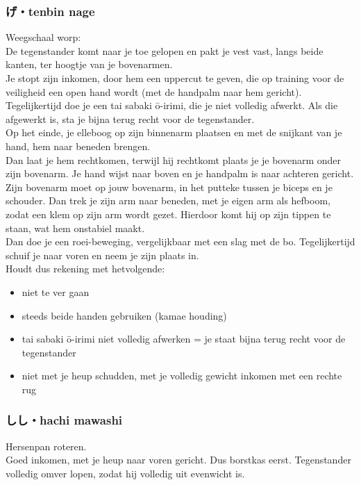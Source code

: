 \subsubsection{げ・tenbin nage}
Weegschaal worp:\\
De tegenstander komt naar je toe gelopen en pakt je vest vast, langs beide kanten, ter hoogtje van je bovenarmen.\\
Je stopt zijn inkomen, door hem een uppercut te geven, die op training voor de veiligheid een open hand wordt (met de handpalm naar hem gericht).\\
Tegelijkertijd doe je een tai sabaki \={o}-irimi, die je niet volledig afwerkt. Als die afgewerkt is, sta je bijna terug recht voor de tegenstander.\\
Op het einde, je elleboog op zijn binnenarm plaatsen en met de snijkant van je hand, hem naar beneden brengen.\\
Dan laat je hem rechtkomen, terwijl hij rechtkomt plaats je je bovenarm onder zijn bovenarm. Je hand wijst naar boven en je handpalm is naar achteren gericht. Zijn bovenarm moet op jouw bovenarm, in het putteke tussen je biceps en je schouder. Dan trek je zijn arm naar beneden, met je eigen arm als hefboom, zodat een klem op zijn arm wordt gezet. Hierdoor komt hij op zijn tippen te staan, wat hem onstabiel maakt.\\
Dan doe je een roei-beweging, vergelijkbaar met een slag met de bo. Tegelijkertijd schuif je naar voren en neem je zijn plaats in.\\

Houdt dus rekening met hetvolgende:
\begin{itemize}
    \item niet te ver gaan
    \item steeds beide handen gebruiken (kamae houding)
    \item tai sabaki \={o}-irimi niet volledig afwerken = je staat bijna terug recht voor de tegenstander
    \item niet met je heup schudden, met je volledig gewicht inkomen met een rechte rug
\end{itemize}

\subsubsection{しし・hachi mawashi}
Hersenpan roteren.\\
Goed inkomen, met je heup naar voren gericht. Dus borstkas eerst. Tegenstander volledig omver lopen, zodat hij volledig uit evenwicht is.

